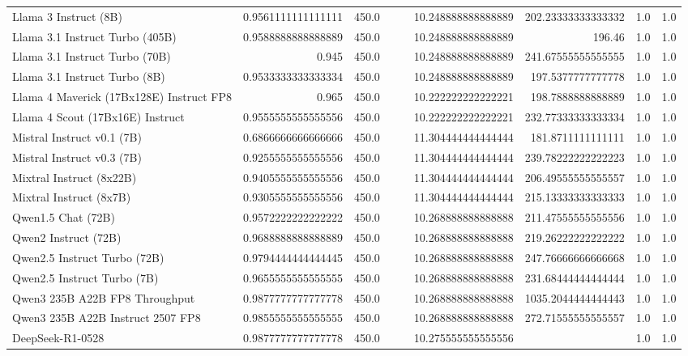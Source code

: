 \begin{table}[htp]
{\begin{tabular}{lrrrrrrrr}
Llama 3 Instruct (8B) & 0.9561111111111111 & 450.0 &  &  & 10.248888888888889 & 202.23333333333332 & 1.0 & 1.0 \\
Llama 3.1 Instruct Turbo (405B) & 0.9588888888888889 & 450.0 &  &  & 10.248888888888889 & 196.46 & 1.0 & 1.0 \\
Llama 3.1 Instruct Turbo (70B) & 0.945 & 450.0 &  &  & 10.248888888888889 & 241.67555555555555 & 1.0 & 1.0 \\
Llama 3.1 Instruct Turbo (8B) & 0.9533333333333334 & 450.0 &  &  & 10.248888888888889 & 197.5377777777778 & 1.0 & 1.0 \\
Llama 4 Maverick (17Bx128E) Instruct FP8 & 0.965 & 450.0 &  &  & 10.222222222222221 & 198.7888888888889 & 1.0 & 1.0 \\
Llama 4 Scout (17Bx16E) Instruct & 0.9555555555555556 & 450.0 &  &  & 10.222222222222221 & 232.77333333333334 & 1.0 & 1.0 \\
Mistral Instruct v0.1 (7B) & 0.6866666666666666 & 450.0 &  &  & 11.304444444444444 & 181.8711111111111 & 1.0 & 1.0 \\
Mistral Instruct v0.3 (7B) & 0.9255555555555556 & 450.0 &  &  & 11.304444444444444 & 239.78222222222223 & 1.0 & 1.0 \\
Mixtral Instruct (8x22B) & 0.9405555555555556 & 450.0 &  &  & 11.304444444444444 & 206.49555555555557 & 1.0 & 1.0 \\
Mixtral Instruct (8x7B) & 0.9305555555555556 & 450.0 &  &  & 11.304444444444444 & 215.13333333333333 & 1.0 & 1.0 \\
Qwen1.5 Chat (72B) & 0.9572222222222222 & 450.0 &  &  & 10.268888888888888 & 211.47555555555556 & 1.0 & 1.0 \\
Qwen2 Instruct (72B) & 0.9688888888888889 & 450.0 &  &  & 10.268888888888888 & 219.26222222222222 & 1.0 & 1.0 \\
Qwen2.5 Instruct Turbo (72B) & 0.9794444444444445 & 450.0 &  &  & 10.268888888888888 & 247.76666666666668 & 1.0 & 1.0 \\
Qwen2.5 Instruct Turbo (7B) & 0.9655555555555555 & 450.0 &  &  & 10.268888888888888 & 231.68444444444444 & 1.0 & 1.0 \\
Qwen3 235B A22B FP8 Throughput & 0.9877777777777778 & 450.0 &  &  & 10.268888888888888 & 1035.2044444444443 & 1.0 & 1.0 \\
Qwen3 235B A22B Instruct 2507 FP8 & 0.9855555555555555 & 450.0 &  &  & 10.268888888888888 & 272.71555555555557 & 1.0 & 1.0 \\
DeepSeek-R1-0528 & 0.9877777777777778 & 450.0 &  &  & 10.275555555555556 &  & 1.0 & 1.0 \\

\end{tabular}}
\end{table}
